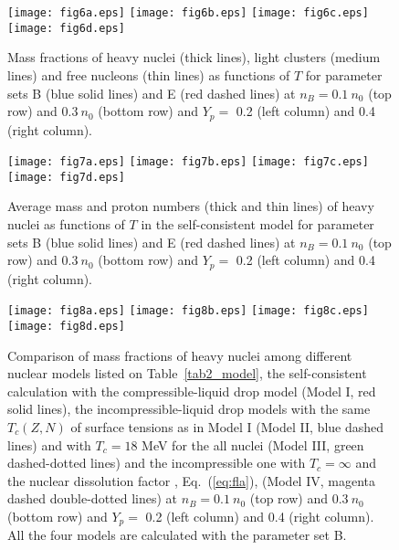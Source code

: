 \documentclass[preprint]{revtex4}
\begin{document}
{{{\begin{figure}
\texttt{[image: fig6a.eps]}
\texttt{[image: fig6b.eps]}
\texttt{[image: fig6c.eps]}
\texttt{[image: fig6d.eps]}
\caption{Mass fractions of  heavy nuclei (thick  lines), light clusters (medium lines) and free nucleons (thin lines)  as functions of  $T$
for parameter sets  B (blue solid lines) and E (red dashed  lines)
at  $n_B=0.1 \ n_0$ (top row) and  $0.3  \ n_0$ (bottom row)
and $Y_p=$ 0.2 (left column) and 0.4 (right column).
}
\label{fig_xfra}
\end{figure}


\begin{figure}
\texttt{[image: fig7a.eps]}
\texttt{[image: fig7b.eps]}
\texttt{[image: fig7c.eps]}
\texttt{[image: fig7d.eps]}
\caption{Average mass  and proton numbers   (thick and thin lines) of heavy nuclei as  functions of  $T$ in the self-consistent model 
 for parameter sets  B (blue solid lines) and E (red dashed  lines)
at  $n_B=0.1 \ n_0$ (top row) and  $0.3  \ n_0$ (bottom row)
and $Y_p=$ 0.2 (left column) and 0.4 (right column).
}
\label{fig_mamz}
\end{figure}


\begin{figure}
\texttt{[image: fig8a.eps]}
\texttt{[image: fig8b.eps]}
\texttt{[image: fig8c.eps]}
\texttt{[image: fig8d.eps]}
\caption{Comparison of mass fractions of heavy nuclei  among different nuclear models listed on Table~\ref{tab2_model}, the self-consistent calculation with the compressible-liquid drop model (Model I, red solid lines),  the incompressible-liquid drop models  with the same $T_c(Z,N)$ of surface tensions  as in Model I (Model II, blue dashed lines) and with $T_c=18$ MeV for the all nuclei (Model III, green dashed-dotted lines) and the incompressible one with $T_c=\infty$ and the nuclear dissolution factor \cite{pais16}, Eq.~(\ref{eq:fla}), (Model IV, magenta dashed double-dotted  lines)
at  $n_B=0.1 \ n_0$ (top row) and  $0.3  \ n_0$ (bottom row)
and $Y_p=$ 0.2 (left column) and 0.4 (right column).
All the four models are calculated with the parameter set  B.
}
\label{fig_xfracmp}
\end{figure}


}}}
\end{document}
